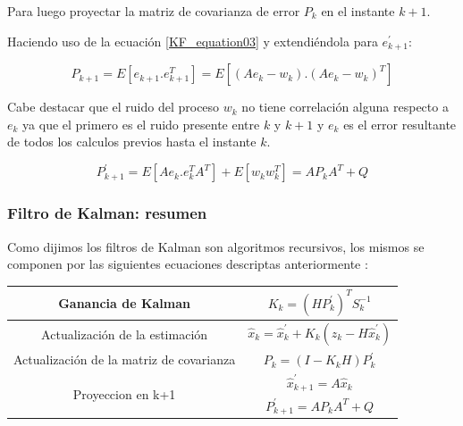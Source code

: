 \documentclass[10pt,a4paper]{article}
\begin{document}
	Para luego proyectar la matriz de covarianza de error $P_k$ en el instante $k+1$.
	
	Haciendo uso de la ecuación \ref{KF_equation03} y extendiéndola para $e^\prime_{k+1}$:
	
	\begin{figure}[h!]
		\begin{center}
			\begin{equation}
				P_{k+1} = E[e_{k+1}.e_{k+1}^{T}] = E[(A e_k-w_k).(A  e_k-w_k)^{T}]
				\label{projection_p_k_aux}
			\end{equation}	
		\end{center}
	\end{figure}
	
	Cabe destacar que el ruido del proceso $w_k$ no tiene correlación alguna respecto a $e_k$ ya que el primero es el ruido presente entre $k$ y $k+1$ y $e_k$ es el error resultante de todos los calculos previos hasta el instante $k$.
	
	\begin{figure}[h!]
		\begin{center}
			\begin{equation}
				P^\prime_{k+1} = E[A e_{k}.e_{k}^{T}A^{T}]+ E[w_k w_k^{T}]= A P_k A^{T} + Q
				\label{projection_p_k}
			\end{equation}	
		\end{center}
	\end{figure}
	
	\clearpage
	
	\subsubsection{Filtro de Kalman: resumen}
	
	Como dijimos los filtros de Kalman son algoritmos recursivos, los mismos se componen por las siguientes ecuaciones descriptas anteriormente :\\
	
	
	\begin{table}[h!]
		\centering
		\begin{tabular}{|c|c|}
			\hline
			\rule{0pt}{4ex}	Ganancia de Kalman 							& $K_k = (H P^\prime_k)^T S_k^{-1}$  \\ \hline
			\rule{0pt}{4ex}	Actualización de la estimación			    &  $\hat{x}_k = \hat{x}^\prime_k + K_k (z_k - H\hat{x}^\prime_k)$\\ \hline
			\rule{0pt}{4ex}	Actualización de la matriz de covarianza    & $P_k = (I - K_k H) P^\prime_k$ \\ \hline
			\multirow{2}{*}{Proyeccion en k+1}        		  			& \rule{0pt}{4ex} $\hat{x}^\prime_{k+1} = A \hat{x}_k$ \\ \cline{2-2}
			& \rule{0pt}{4ex} $P^\prime_{k+1} = A P_k A^{T} + Q$ \\ \hline
		\end{tabular}
		\label{Ecuaciones_Kalman}
	\end{table}
	
\end{document}
